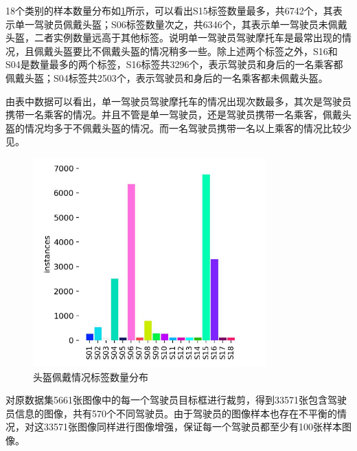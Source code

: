 18个类别的样本数量分布如\ref{fig:label1}所示，可以看出S15标签数量最多，共6742个，其表示单一驾驶员佩戴头盔；S06标签数量次之，共6346个，其表示单一驾驶员未佩戴头盔，二者实例数量远高于其他标签。说明单一驾驶员驾驶摩托车是最常出现的情况，且佩戴头盔要比不佩戴头盔的情况稍多一些。除上述两个标签之外，S16和S04是数量最多的两个标签，S16标签共3296个，表示驾驶员和身后的一名乘客都佩戴头盔；S04标签共2503个，表示驾驶员和身后的一名乘客都未佩戴头盔。

由表中数据可以看出，单一驾驶员驾驶摩托车的情况出现次数最多，其次是驾驶员携带一名乘客的情况。并且不管是单一驾驶员，还是驾驶员携带一名乘客，佩戴头盔的情况均多于不佩戴头盔的情况。而一名驾驶员携带一名以上乘客的情况比较少见。

\begin{figure}[!htb]
    \centering
    \includegraphics[width=0.8\textwidth]{figs/chap03/label1.png}
    \caption{头盔佩戴情况标签数量分布}
    \label{fig:label1}
\end{figure}

对原数据集5661张图像中的每一个驾驶员目标框进行裁剪，得到33571张包含驾驶员信息的图像，共有570个不同驾驶员。由于驾驶员的图像样本也存在不平衡的情况，对这33571张图像同样进行图像增强，保证每一个驾驶员都至少有100张样本图像。


